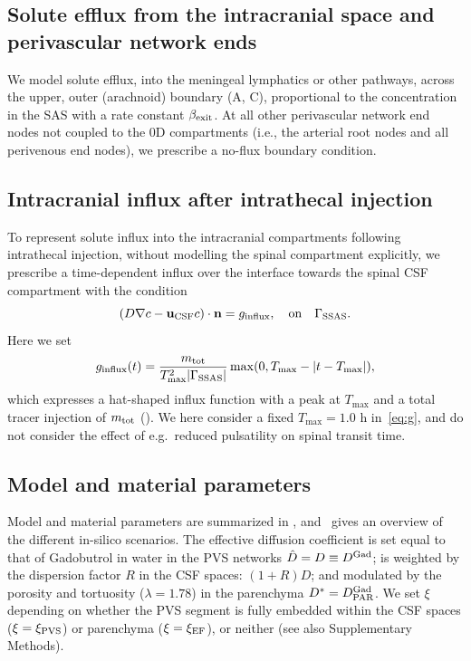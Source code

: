 \documentclass[fleqn,10pt]{wlscirep}
\begin{document}
\subsection*{Solute efflux from the intracranial space and perivascular network ends}

We model solute efflux, into the meningeal lymphatics or other
pathways, across the upper, outer (arachnoid) boundary
(A, C), proportional to the
concentration in the SAS with a rate constant $\beta_{\rm exit}$. At all other perivascular network end nodes not coupled to the 0D
compartments (i.e., the arterial root nodes and all perivenous end
nodes), we prescribe a no-flux boundary condition.

\subsection*{Intracranial influx after intrathecal injection}

To represent solute influx into the intracranial compartments
following intrathecal injection, without modelling the spinal
compartment explicitly, we prescribe a time-dependent influx 
over the interface towards the spinal CSF compartment with the condition
\begin{equation*}
  (D \nabla c - \mathbf{u}_{\rm CSF} c ) \cdot \mathbf{n} = g_{\mathrm{influx}},  \quad \mathrm{on}  \quad \Gamma_{\mathrm{SSAS}}.
\end{equation*}
Here we set
\begin{equation}
  g_\mathrm{influx}(t) = \frac{m_{\rm tot}}{T_{\rm max}^2 |\Gamma_{\rm SSAS}|} \max(0, T_{\rm max} - |t - T_{\rm max}|), 
  \label{eq:g}
\end{equation}
which expresses a hat-shaped influx function with a peak at $T_{\max}$ and a total tracer injection of $m_{\rm tot}$ (). We here consider a fixed $T_{\max} = 1.0$ h in~\eqref{eq:g}, and do not consider the effect of e.g.~reduced pulsatility on spinal transit time.

\subsection*{Model and material parameters}

Model and material parameters are summarized in ,
and~ gives an overview of the different in-silico
scenarios.
%
%
The effective diffusion coefficient is set equal to that of Gadobutrol
in water in the PVS networks $\hat{D} = D \equiv D^{\rm Gad}$; is 
weighted by the dispersion factor $R$ in the CSF spaces: $(1 + R) D$;
and modulated by the porosity and tortuosity ($\lambda = 1.78$) in the
parenchyma $D^{\ast} = D^{\rm Gad}_{\rm PAR}$. We set $\xi$ depending
on whether the PVS segment is fully embedded within the CSF spaces
($\xi = \xi_{\rm PVS}$) or parenchyma ($\xi = \xi_{\rm EF}$), or
neither (see also Supplementary Methods). 
\end{document}
